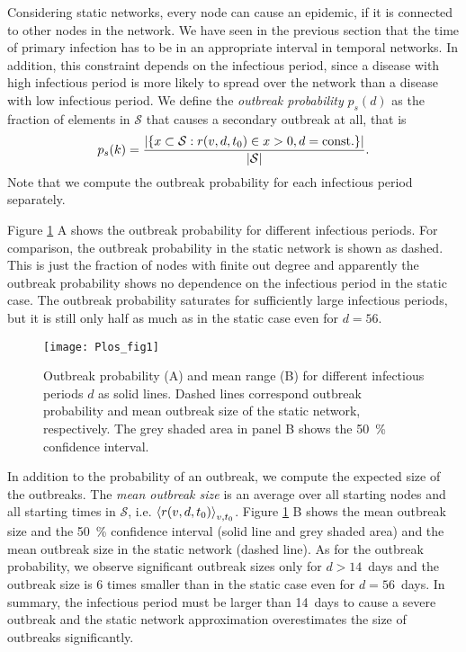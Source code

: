 Considering static networks, every node can cause an epidemic, if it is connected to other nodes in the network.
We have seen in the previous section that the time of primary infection has to be in an appropriate interval in temporal networks.
In addition, this constraint depends on the infectious period, since a disease with high infectious period is more likely to spread over the network than a disease with low infectious period.
We define the \emph{outbreak probability} $p_s(d)$ as the fraction of elements in $\mathcal{S}$ that causes a secondary outbreak at all, that is
\begin{equation}\label{eq:outbreak_prob}
p_s(k)=\frac{\left| \left\{ x \subset \mathcal{S}: r(v,d,t_0) \in x >0, d=\mathrm{const.} \right\} \right|}{\left| \mathcal{S} \right|} .
\end{equation}
Note that we compute the outbreak probability for each infectious period separately.

Figure \ref{fig:plosfig1} A shows the outbreak probability for different infectious periods.
For comparison, the outbreak probability in the static network is shown as dashed.
This is just the fraction of nodes with finite out degree and apparently the outbreak probability shows no dependence on the infectious period in the static case.
The outbreak probability saturates for sufficiently large infectious periods, but it is still only half as much as in the static case even for $d=56$.
%
\begin{figure}[htbp]
\begin{center}
\texttt{[image: Plos\_fig1]}
\caption{Outbreak probability (A) and mean range (B) for different infectious periods $d$ as solid lines.
Dashed lines correspond outbreak probability and mean outbreak size of the static network, respectively.
The grey shaded area in panel B shows the 50~\% confidence interval.}
\label{fig:plosfig1}
\end{center}
\end{figure}

In addition to the probability of an outbreak, we compute the expected size of the outbreaks.
The \emph{mean outbreak size} is an average over all starting nodes and all starting times in $\mathcal{S}$, i.e. $\left< r(v,d,t_0) \right>_{v,t_0}$.
Figure \ref{fig:plosfig1} B shows the mean outbreak size and the 50~\% confidence interval (solid line and grey shaded area) and the mean outbreak size in the static network (dashed line).
As for the outbreak probability, we observe significant outbreak sizes only for $d>14$~days and the outbreak size is 6 times smaller than in the static case even for $d=56$~days.
In summary, the infectious period must be larger than 14~days to cause a severe outbreak and the static network approximation overestimates the size of outbreaks significantly.

